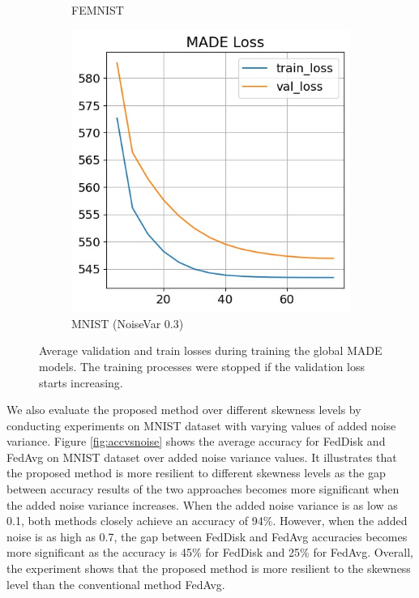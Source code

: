 \documentclass[mathfont=newtx]{uai2023} %
\newcommand{\MethodnameShort}{FedDisk}
\begin{document}
\begin{figure}[ht!]
\begin{subfigure}[t]{0.3\linewidth}
		\caption{FEMNIST}
		\label{fig:made_loss_femnist}
	\end{subfigure}
	\hspace{0.01em}%
	\begin{subfigure}[t]{0.3\linewidth}	
		\includegraphics[width=\linewidth]{Figures/mnist/MADE_loss}
		\caption{MNIST (NoiseVar 0.3)  }
		\label{fig:made_loss_mnist}
	\end{subfigure}
	\caption{Average validation and train losses during training the global MADE models. The training processes were stopped if the validation loss starts increasing. }
	\label{fig:made_loss}
\end{figure}
We also evaluate the proposed method over different skewness levels by conducting experiments on MNIST dataset with varying values of added noise variance. Figure \ref{fig:accvsnoise} shows the average accuracy for FedDisk and FedAvg on MNIST dataset over added noise variance values. It illustrates that the proposed method is more resilient to different skewness levels as the gap between accuracy results of the two approaches becomes more significant when the added noise variance increases. When the added noise variance is as low as 0.1, both methods closely achieve an accuracy of 94\%. However, when the added noise is as high as 0.7, the gap between \MethodnameShort{} and FedAvg accuracies becomes more significant as the accuracy is 45\% for \MethodnameShort{} and 25\% for FedAvg. Overall, the experiment shows that the proposed method is more resilient to the skewness level than the conventional method FedAvg.
\end{document}
